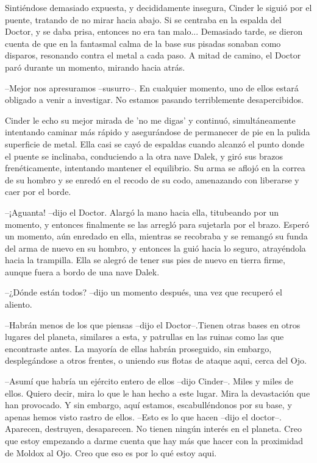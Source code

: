 Sintiéndose demasiado expuesta, y decididamente insegura, Cinder le siguió por el puente, tratando de no mirar hacia abajo. Si se centraba en la espalda del Doctor, y se daba prisa, entonces no era tan malo...
Demasiado tarde, se dieron cuenta de que en la fantasmal calma de la base sus pisadas sonaban como disparos, resonando contra el metal a cada paso. A mitad de camino, el Doctor paró durante un momento, mirando hacia atrás. 

--Mejor nos apresuramos --susurro--. En cualquier momento, uno de ellos estará obligado a venir a investigar. No estamos pasando terriblemente desapercibidos.

Cinder le echo su mejor mirada de 'no me digas' y continuó, simultáneamente intentando caminar más rápido y asegurándose de permanecer de pie en la pulida superficie de metal. Ella casi se cayó de espaldas cuando alcanzó el punto donde el puente se inclinaba, conduciendo a la otra nave Dalek, y giró sus brazos frenéticamente, intentando mantener el equilibrio. Su arma se aflojó en la correa de su hombro y se enredó en el recodo de su codo, amenazando con liberarse y caer por el borde.

--¡Aguanta! --dijo el Doctor. Alargó la mano hacia ella, titubeando por un momento, y entonces finalmente se las arregló para sujetarla por el brazo. Esperó un momento, aún enredado en ella, mientras se recobraba y se remangó su funda del arma de nuevo en su hombro, y entonces la guió hacia lo seguro, atrayéndola hacia la trampilla. Ella se alegró de tener sus pies de nuevo en tierra firme, aunque fuera a bordo de una nave Dalek.

--¿Dónde están todos? --dijo un momento después, una vez que recuperó el aliento. 

--Habrán menos de los que piensas --dijo el Doctor--.Tienen otras bases en otros lugares del planeta, similares a esta, y patrullas en las ruinas como las que encontraste antes. La mayoría de ellas habrán proseguido, sin embargo, desplegándose a otros frentes, o uniendo sus flotas de ataque aqui, cerca del Ojo.

--Asumí que habría un ejército entero de ellos --dijo Cinder--. Miles y miles de ellos. Quiero decir, mira lo que le han hecho a este lugar. Mira la devastación que han provocado. Y sin embargo, aquí estamos, escabulléndonos por su base, y apenas hemos visto rastro de ellos.
--Esto es lo que hacen --dijo el doctor--. Aparecen, destruyen, desaparecen. No tienen ningún interés en el planeta. Creo que estoy empezando a darme cuenta que hay más que hacer con la proximidad de Moldox al Ojo. Creo que eso es por lo qué estoy aqui.

